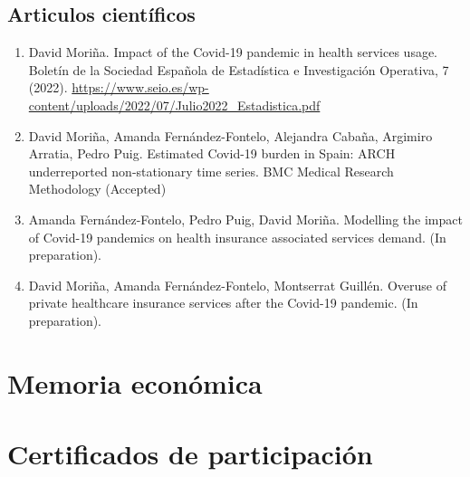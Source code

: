 \documentclass[12pt,twoside]{article} %
\begin{document}
\subsection{Articulos científicos}
\begin{enumerate}
\item David Moriña. Impact of the Covid-19 pandemic in health services usage. Boletín de la Sociedad Española de Estadística e Investigación Operativa, 7 (2022). \url{https://www.seio.es/wp-content/uploads/2022/07/Julio2022_Estadistica.pdf}
\item David Moriña, Amanda Fernández-Fontelo, Alejandra Cabaña, Argimiro Arratia, Pedro Puig. Estimated Covid-19 burden in Spain: ARCH underreported non-stationary time series. BMC Medical Research Methodology (Accepted)
\item Amanda Fernández-Fontelo, Pedro Puig, David Moriña. Modelling the impact of Covid-19 pandemics on health insurance associated services demand. (In preparation).
\item David Moriña, Amanda Fernández-Fontelo, Montserrat Guillén. Overuse of private healthcare insurance services after the Covid-19 pandemic. (In preparation).
\end{enumerate}

\section{Memoria económica}

\section*{Certificados de participación}




\parskip=0pt
\parsep=0pt



\end{document}
